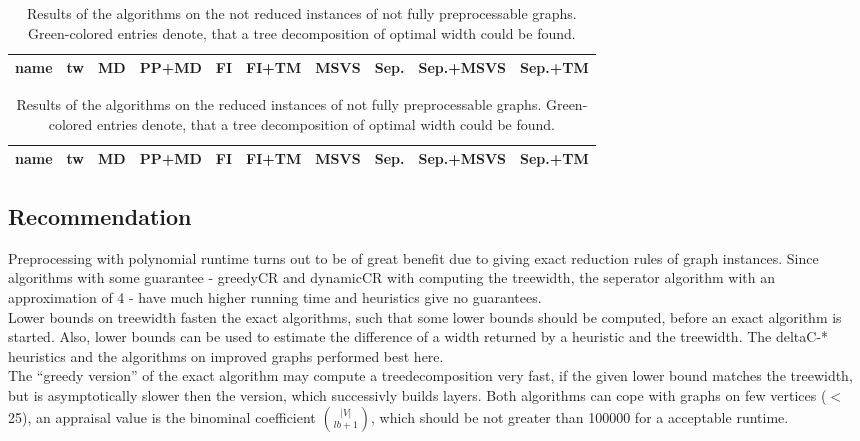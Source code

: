 \documentclass[a4wide]{article}
\begin{document}
\begin{table}[h!]
\small{
\begin{tabular}{|l|l|l|l|l|l|l|l|l|l|}
\hline
name & tw & MD & PP+MD & FI & FI+TM & MSVS & Sep. & Sep.+MSVS & Sep.+TM \\
\hline
\hline

\hline
\end{tabular}
}
\caption{Results of the algorithms on the not reduced instances of not fully preprocessable graphs. Green-colored entries denote, that a tree decomposition of optimal width could be found.}
\end{table}

\begin{table}[h!]
\small{
\begin{tabular}{|l|l|l|l|l|l|l|l|l|l|}
\hline
name & tw & MD & PP+MD & FI & FI+TM & MSVS & Sep. & Sep.+MSVS & Sep.+TM \\
\hline
\hline

\hline
\end{tabular}
}
\caption{Results of the algorithms on the reduced instances of not fully preprocessable graphs. Green-colored entries denote, that a tree decomposition of optimal width could be found.}
\end{table}

\newpage

\subsection{Recommendation}

Preprocessing with polynomial runtime turns out to be of great benefit due to giving exact reduction rules of graph instances. Since algorithms with some guarantee - greedyCR and dynamicCR with computing the treewidth, the seperator algorithm with an approximation of 4 - have much higher running time and heuristics give no guarantees. \\

Lower bounds on treewidth fasten the exact algorithms, such that some lower bounds should be computed, before an exact algorithm is started. Also, lower bounds can be used to estimate the difference of a width returned by a heuristic and the treewidth. The deltaC-* heuristics and the algorithms on improved graphs performed best here. \\

The \enquote{greedy version} of the exact algorithm may compute a treedecomposition very fast, if the given lower bound matches the treewidth, but is asymptotically slower then the version, which successivly builds layers. Both algorithms can cope with graphs on few vertices ($<$ 25), an appraisal value is the binominal coefficient $\binom{|V|}{lb+1}$, which should be not greater than 100000 for a acceptable runtime. \\
\end{document}
